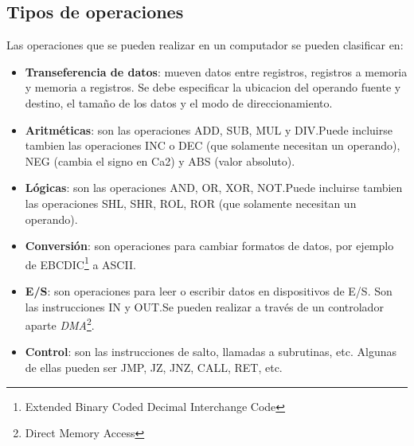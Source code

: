\subsection{Tipos de operaciones}

Las operaciones que se pueden realizar en un computador se pueden clasificar en:

\begin{itemize}
  \item \textbf{Transeferencia de datos}: mueven datos entre registros, registros a memoria y memoria a registros. Se debe especificar la ubicacion del operando fuente y destino, el tamaño de los datos y el modo de direccionamiento.
  \item \textbf{Aritméticas}: son las operaciones ADD, SUB, MUL y DIV.\@ Puede incluirse tambien las operaciones INC o DEC (que solamente necesitan un operando), NEG (cambia el signo en Ca2) y ABS (valor absoluto).
  \item \textbf{Lógicas}: son las operaciones AND, OR, XOR, NOT.\@ Puede incluirse tambien las operaciones SHL, SHR, ROL, ROR (que solamente necesitan un operando).
  \item \textbf{Conversión}: son operaciones para cambiar formatos de datos, por ejemplo de EBCDIC\footnote{Extended Binary Coded Decimal Interchange Code} a ASCII.\@
  \item \textbf{E/S}: son operaciones para leer o escribir datos en dispositivos de E/S. Son las instrucciones IN y OUT.\@ Se pueden realizar a través de un controlador aparte \textit{DMA}\footnote{Direct Memory Access}.
  \item \textbf{Control}: son las instrucciones de salto, llamadas a subrutinas, etc. Algunas de ellas pueden ser JMP, JZ, JNZ, CALL, RET, etc.
\end{itemize}